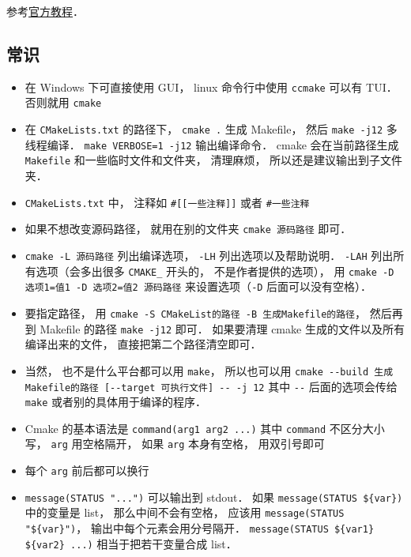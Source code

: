 
\begin{issues}
\issueDraft
\end{issues}


参考\href{https://cmake.org/cmake/help/latest/guide/tutorial/index.html}{官方教程}．

\subsection{常识}
\begin{itemize}
\item 在 Windows 下可直接使用 GUI， linux 命令行中使用 \verb`ccmake` 可以有 TUI． 否则就用 \verb`cmake`
\item 在 \verb|CMakeLists.txt| 的路径下， \verb`cmake .` 生成 Makefile， 然后 \verb|make -j12| 多线程编译． \verb|make VERBOSE=1 -j12| 输出编译命令． cmake 会在当前路径生成 \verb|Makefile| 和一些临时文件和文件夹， 清理麻烦， 所以还是建议输出到子文件夹．
\item \verb|CMakeLists.txt| 中， 注释如 \verb|#[[一些注释]]| 或者 \verb|#一些注释|
\item 如果不想改变源码路径， 就用在别的文件夹 \verb|cmake 源码路径| 即可．
\item \verb|cmake -L 源码路径| 列出编译选项， \verb|-LH| 列出选项以及帮助说明． \verb|-LAH| 列出所有选项（会多出很多 \verb|CMAKE_| 开头的， 不是作者提供的选项）， 用 \verb|cmake -D 选项1=值1 -D 选项2=值2 源码路径| 来设置选项（\verb|-D| 后面可以没有空格）．
\item 要指定路径， 用 \verb|cmake -S CMakeList的路径 -B 生成Makefile的路径|， 然后再到 Makefile 的路径 \verb|make -j12| 即可． 如果要清理 cmake 生成的文件以及所有编译出来的文件， 直接把第二个路径清空即可．
\item 当然， 也不是什么平台都可以用 \verb|make|， 所以也可以用 \verb|cmake --build 生成Makefile的路径 [--target 可执行文件] -- -j 12| 其中 \verb|--| 后面的选项会传给 \verb|make| 或者别的具体用于编译的程序．
\item Cmake 的基本语法是 \verb`command(arg1 arg2 ...)` 其中 \verb|command| 不区分大小写， \verb`arg` 用空格隔开， 如果 \verb|arg| 本身有空格， 用双引号即可
\item 每个 \verb`arg` 前后都可以换行
\item \verb`message(STATUS "...")` 可以输出到 stdout． 如果 \verb`message(STATUS ${var})` 中的变量是 list， 那么中间不会有空格， 应该用 \verb`message(STATUS "${var}")`， 输出中每个元素会用分号隔开． \verb`message(STATUS ${var1} ${var2} ...)` 相当于把若干变量合成 list．

\end{itemize}
